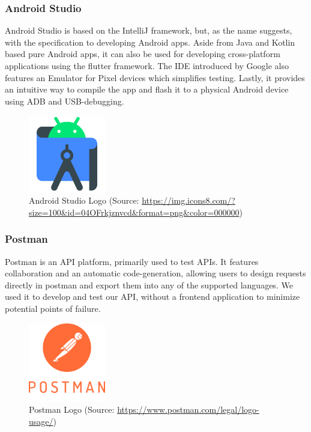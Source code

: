 \subsubsection{Android Studio}
Android Studio is based on the IntelliJ framework, but, as the name suggests, with the specification to developing Android apps. Aside from Java and Kotlin based pure Android apps, it can also be used for developing cross-platform applications using the flutter framework. The IDE introduced by Google also features an Emulator for Pixel devices which simplifies testing. Lastly, it provides an intuitive way to compile the app and flash it to a physical Android device using ADB and USB-debugging. 

\begin{figure} [H]
    \center
    \includegraphics [width=0.3\textwidth] {images/Technologies/androidstudioLogo.png}
    \caption{Android Studio Logo (Source: \url{https://img.icons8.com/?size=100&id=04OFrkjznvcd&format=png&color=000000})}
\end{figure}

\subsubsection{Postman}
Postman is an API platform, primarily used to test APIs. It features collaboration and an automatic code-generation, allowing users to design requests directly in postman and export them into any of the supported languages. We used it to develop and test our API, without a frontend application to minimize potential points of failure.

\begin{figure} [H]
    \center
    \includegraphics [width=0.3\textwidth] {images/Technologies/postmanLogo.png}
    \caption{Postman Logo (Source: \url{https://www.postman.com/legal/logo-usage/})}
\end{figure}

\newpage